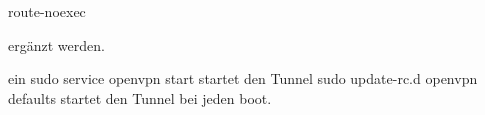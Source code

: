 route-noexec

ergänzt werden.

ein 
sudo service openvpn start 
startet den Tunnel
sudo update-rc.d openvpn defaults
startet den Tunnel bei jeden boot.


















